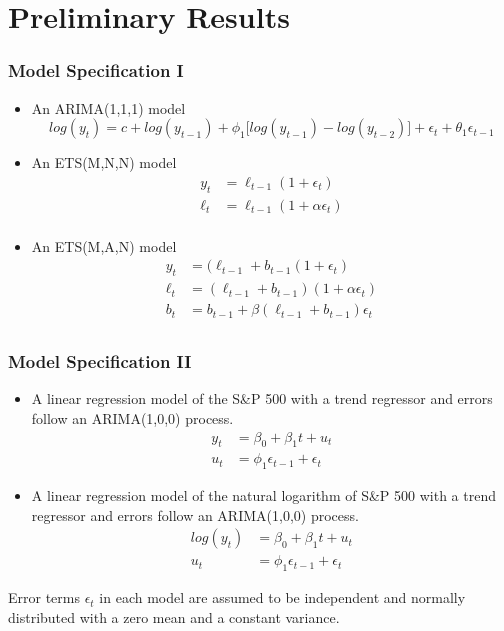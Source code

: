 
\section{Preliminary Results}


\begin{frame}
    \frametitle{Model Specification I}

    \begin{itemize}
    \item An ARIMA(1,1,1) model 
        \begin{equation*}
        log(y_t) = c + log(y_{t-1}) + \phi_1\big[log(y_{t-1})-log(y_{t-2})\big] + \epsilon_t + \theta_1\epsilon_{t-1}
        \end{equation*}
    \item An ETS(M,N,N) model
        \begin{align*}
        y_t &= \ell_{t-1} (1+\epsilon_t) \\
        \ell_t &= \ell_{t-1} (1+\alpha \epsilon_t) \\
        \end{align*}
    \item An ETS(M,A,N) model
        \begin{align*}
        y_t &= (\ell_{t-1} + b_{t-1} (1+\epsilon_t) \\
        \ell_t &= (\ell_{t-1} + b_{t-1}) (1+\alpha \epsilon_t) \\
        b_t &= b_{t-1} + \beta (\ell_{t-1} + b_{t-1})\epsilon_t \\
        \end{align*}
    \end{itemize}

\end{frame}

\begin{frame}
    \frametitle{Model Specification II}

    \begin{itemize}
    \item A linear regression model of the S\&P 500 with a trend regressor and errors follow an ARIMA(1,0,0) process. 
        \begin{align*}
        y_t &= \beta_0 + \beta_1 t + u_t \\
        u_t &= \phi_1 \epsilon_{t-1} + \epsilon_t
        \end{align*}

    \item A linear regression model of the natural logarithm of S\&P 500 with a trend regressor and errors follow an ARIMA(1,0,0) process. 
        \begin{align*}
        log(y_t) &= \beta_0 + \beta_1 t + u_t \\
        u_t &= \phi_1 \epsilon_{t-1} + \epsilon_t
        \end{align*}
    \end{itemize}

Error terms $\epsilon_t$ in each model are assumed to be independent and normally distributed with a zero mean and a constant variance.

\end{frame}




